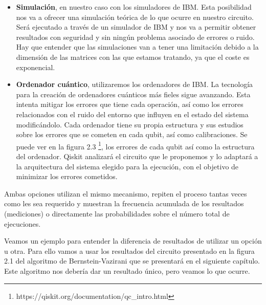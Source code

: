 \begin{itemize}
     \item \textbf{Simulación}, en nuestro caso con los simuladores de IBM. Esta posibilidad nos va a ofrecer una simulación teórica de lo que ocurre en nuestro circuito. Será ejecutado a través de un simulador de IBM y nos va a permitir obtener resultados con seguridad y sin ningún problema asociado de errores o ruido. Hay que entender que las simulaciones van a tener una limitación debido a la dimensión de las matrices con las que estamos tratando, ya que el coste es exponencial.
     
     \item \textbf{Ordenador cuántico}, utilizaremos los ordenadores de IBM. La tecnología para la creación de ordenadores cuánticos más fieles sigue avanzando. Esta intenta mitigar los errores que tiene cada operación, así como los errores relacionados con el ruido del entorno que influyen en el estado del sistema modificándolo. Cada ordenador tiene su propia estructura y sus estudios sobre los errores que se cometen en cada qubit, así como calibraciones. Se puede ver en la figura 2.3 \footnote{https://qiskit.org/documentation/qc\_intro.html}, los errores de cada qubit así como la estructura del ordenador. Qiskit analizará el circuito que le proponemos y lo adaptará a la arquitectura del sistema elegido para la ejecución, con el objetivo de minimizar los errores cometidos.
     
 \end{itemize}

\newpage
 Ambas opciones utilizan el mismo mecanismo, repiten el proceso tantas veces como les sea requerido y muestran la frecuencia acumulada de los resultados (mediciones) o directamente las probabilidades sobre el número total de ejecuciones. \newline

 Veamos un ejemplo para entender la diferencia de resultados de utilizar un opción u otra. Para ello vamos a usar los resultados del circuito presentado en la figura 2.1 del algoritmo de Bernstein-Vazirani que se presentará en el siguiente capítulo. Este algoritmo nos debería dar un resultado único, pero veamos lo que ocurre. \newline
 


